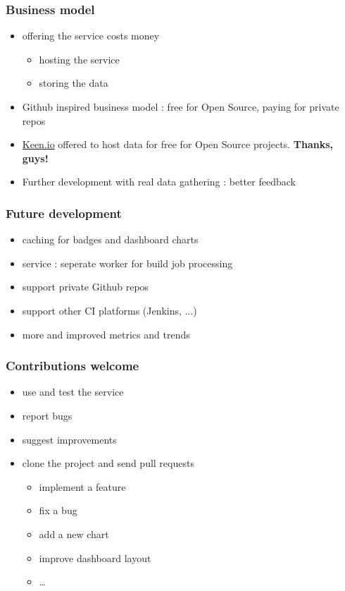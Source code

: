 \documentclass[14pt]{beamer}
\begin{document}
  \begin{frame}
    \frametitle{Business model}
    \begin{itemize}
      \item offering the service costs money
        \begin{itemize}
	  \item hosting the service
          \item storing the data
        \end{itemize}
      \item Github inspired business model : free for Open Source, paying for private repos
      \item \href{https://keen.io}{Keen.io} offered to host data for free for Open Source projects. \textbf{Thanks, guys!}
      \item Further development with real data gathering : better feedback
    \end{itemize}
  \end{frame}
  \begin{frame}
    \frametitle{Future development}
    \begin{itemize}
      \item caching for badges and dashboard charts
      \item service : seperate worker for build job processing
      \item support private Github repos
      \item support other CI platforms (Jenkins, ...)
      \item more and improved metrics and trends
    \end{itemize}
  \end{frame}
  \begin{frame}
    \frametitle{Contributions welcome}
    \begin{itemize}
      \item use and test the service
      \item report bugs
      \item suggest improvements
      \item clone the project and send pull requests
      \begin{itemize}
        \item implement a feature
        \item fix a bug
        \item add a new chart
        \item improve dashboard layout
        \item \ldots
      \end{itemize}
    \end{itemize}
  \end{frame}
\end{document}
